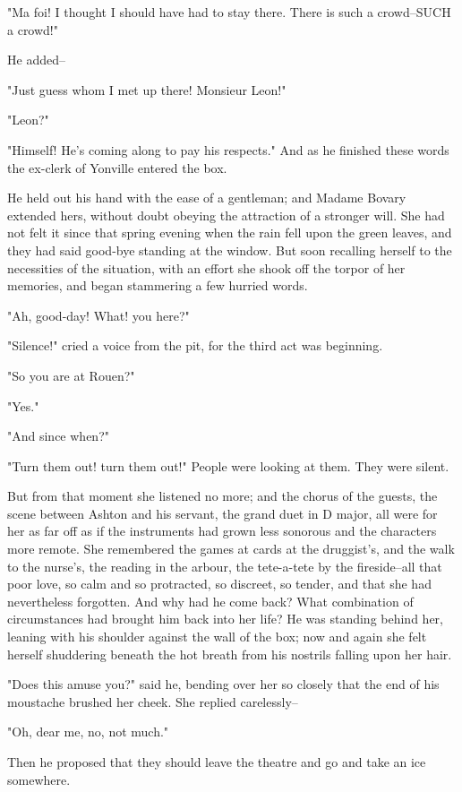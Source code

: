 \documentclass{tufte-book}
\begin{document}
"Ma foi! I thought I should have had to stay there. There is such a
crowd--SUCH a crowd!"

He added--

"Just guess whom I met up there! Monsieur Leon!"

"Leon?"

"Himself! He's coming along to pay his respects." And as he finished
these words the ex-clerk of Yonville entered the box.

He held out his hand with the ease of a gentleman; and Madame Bovary
extended hers, without doubt obeying the attraction of a stronger will.
She had not felt it since that spring evening when the rain fell upon
the green leaves, and they had said good-bye standing at the window.
But soon recalling herself to the necessities of the situation, with an
effort she shook off the torpor of her memories, and began stammering a
few hurried words.

"Ah, good-day! What! you here?"

"Silence!" cried a voice from the pit, for the third act was beginning.

"So you are at Rouen?"

"Yes."

"And since when?"

"Turn them out! turn them out!" People were looking at them. They were
silent.

But from that moment she listened no more; and the chorus of the guests,
the scene between Ashton and his servant, the grand duet in D major, all
were for her as far off as if the instruments had grown less sonorous
and the characters more remote. She remembered the games at cards at the
druggist's, and the walk to the nurse's, the reading in the arbour,
the tete-a-tete by the fireside--all that poor love, so calm and so
protracted, so discreet, so tender, and that she had nevertheless
forgotten. And why had he come back? What combination of circumstances
had brought him back into her life? He was standing behind her, leaning
with his shoulder against the wall of the box; now and again she felt
herself shuddering beneath the hot breath from his nostrils falling upon
her hair.

"Does this amuse you?" said he, bending over her so closely that the end
of his moustache brushed her cheek. She replied carelessly--

"Oh, dear me, no, not much."

Then he proposed that they should leave the theatre and go and take an
ice somewhere.
\end{document}
